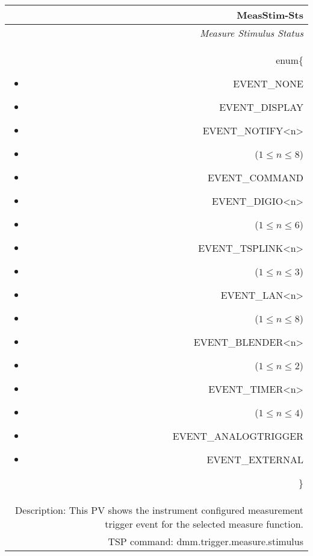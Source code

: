\documentclass[openany]{article}
\begin{document}
		\begin{tabular}{N}
			\hline
			\bfseries MeasStim-Sts\label{pv:measstim-sts} \\ \hline
			\emph{Measure Stimulus Status} \\
			enum\{\begin{itemize}[noitemsep]
				\small
				\item[] EVENT\_NONE
				\item[] EVENT\_DISPLAY
				\item[] EVENT\_NOTIFY\textless n\textgreater
				\item[] ($1\leq n\leq 8$)
				\item[] EVENT\_COMMAND
				\item[] EVENT\_DIGIO\textless n\textgreater
				\item[] ($1\leq n\leq 6$)
				\item[] EVENT\_TSPLINK\textless n\textgreater
				\item[] ($1\leq n\leq 3$)
				\item[] EVENT\_LAN\textless n\textgreater
				\item[] ($1\leq n\leq 8$)
				\item[] EVENT\_BLENDER\textless n\textgreater
				\item[] ($1\leq n\leq 2$)
				\item[] EVENT\_TIMER\textless n\textgreater
				\item[] ($1\leq n\leq 4$)
				\item[] EVENT\_ANALOGTRIGGER
				\item[] EVENT\_EXTERNAL
			\end{itemize}\} \\
			Description: This PV shows the instrument configured measurement trigger event for the selected measure function. \\
			TSP command: dmm.trigger.measure.stimulus
		\end{tabular}
\end{document}
